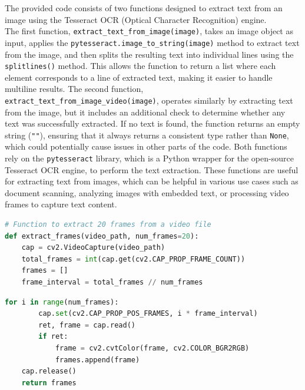 \noindent
The provided code consists of two functions designed to extract text from an image using the Tesseract OCR (Optical Character Recognition) engine. \\
The first function, \texttt{extract\_text\_from\_image(image)}, takes an image object as input, applies the \texttt{pytesseract.image\_to\_string(image)} method to extract text from the image, and then splits the resulting text into individual lines using the \texttt{splitlines()} method. This allows the function to return a list where each element corresponds to a line of extracted text, making it easier to handle multiline results. The second function, \\ \texttt{extract\_text\_from\_image\_video(image)}, operates similarly by extracting text from the image, but it includes an additional check to determine whether any text was successfully extracted. If no text is found, the function returns an empty string (\texttt{""}), ensuring that it always returns a consistent type rather than \texttt{None}, which could potentially cause issues in other parts of the code. Both functions rely on the \texttt{pytesseract} library, which is a Python wrapper for the open-source Tesseract OCR engine, to perform the text extraction. These functions are useful for extracting text from images, which can be helpful in various use cases such as document scanning, analyzing images with embedded text, or processing video frames to capture text content.


\begin{tcolorbox}[colback=gray!5!white, colframe=gray!80!black, boxrule=0.5pt, title=Extract Frames from Video File]
    \begin{lstlisting}[language=Python]
# Function to extract 20 frames from a video file
def extract_frames(video_path, num_frames=20):
    cap = cv2.VideoCapture(video_path)
    total_frames = int(cap.get(cv2.CAP_PROP_FRAME_COUNT))
    frames = []
    frame_interval = total_frames // num_frames
    \end{lstlisting}
\end{tcolorbox}
\begin{tcolorbox}[colback=gray!5!white, colframe=gray!80!black, boxrule=0.5pt, title=Extract Frames from Video File]
    \begin{lstlisting}[language=Python]
    for i in range(num_frames):
        cap.set(cv2.CAP_PROP_POS_FRAMES, i * frame_interval)
        ret, frame = cap.read()
        if ret:
            frame = cv2.cvtColor(frame, cv2.COLOR_BGR2RGB)
            frames.append(frame)
    cap.release()
    return frames
    \end{lstlisting}
\end{tcolorbox}

